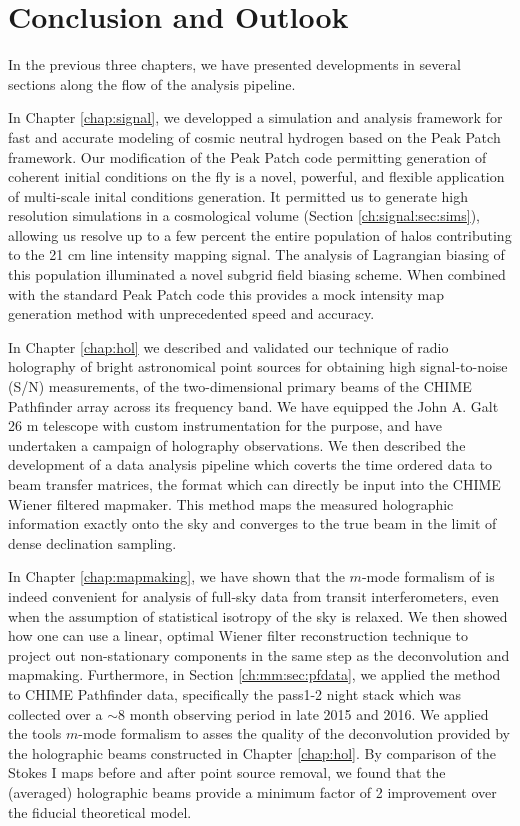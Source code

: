 \chapter{Conclusion and Outlook}
\label{chap:conclusion}

In the previous three chapters, we have presented developments in several sections along the flow of the analysis pipeline.

In Chapter \ref{chap:signal}, we developped a simulation and analysis framework for fast and accurate modeling of cosmic neutral hydrogen based on the Peak Patch framework. Our modification of the Peak Patch code permitting generation of coherent initial conditions on the fly is a novel, powerful, and flexible application of multi-scale inital conditions generation. It permitted us to generate high resolution simulations in a cosmological volume (Section \ref{ch:signal:sec:sims}), allowing us resolve up to a few percent the entire population of halos contributing to the 21 cm line intensity mapping signal. The analysis of Lagrangian biasing of this population illuminated a novel subgrid field biasing scheme. When combined with the standard Peak Patch code this provides a mock intensity map generation method with unprecedented speed and accuracy.

In Chapter \ref{chap:hol} we described and validated our technique of radio holography of bright astronomical point sources for obtaining high signal-to-noise (S/N) measurements, of the two-dimensional primary beams of the CHIME Pathfinder array across its frequency band. We have equipped the John A. Galt 26 m telescope with custom instrumentation for the purpose, and have undertaken a campaign of holography observations. We then described the development of a data analysis pipeline which coverts the time ordered data to beam transfer matrices, the format which can directly be input into the CHIME Wiener filtered mapmaker. This method maps the measured holographic information exactly onto the sky and converges to the true beam in the limit of dense declination sampling.

In Chapter \ref{chap:mapmaking}, we have shown that the $m$-mode formalism of \cite{mmodes1, mmodes2} is indeed convenient for analysis of full-sky data from transit interferometers, even when the assumption of statistical isotropy of the sky is relaxed. We then showed how one can use a linear, optimal Wiener filter reconstruction technique to project out non-stationary components in the same step as the deconvolution and mapmaking. Furthermore, in Section \ref{ch:mm:sec:pfdata}, we applied the method to CHIME Pathfinder data, specifically the pass1-2 night stack which was collected over a $\sim$8 month observing period in late 2015 and 2016. We applied the tools $m$-mode formalism to asses the quality of the deconvolution provided by the holographic beams constructed in Chapter \ref{chap:hol}. By comparison of the Stokes I maps before and after point source removal, we found that the (averaged) holographic beams provide a minimum factor of 2 improvement over the fiducial theoretical model.


